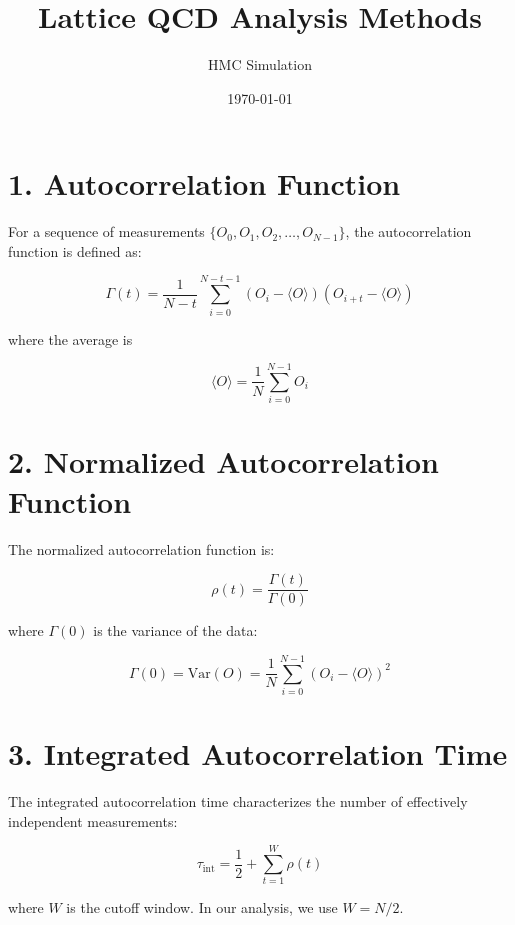 \documentclass[12pt,a4paper]{article}
\title{Lattice QCD Analysis Methods}
\author{HMC Simulation}
\date{\today}
\begin{document}
\maketitle

\section*{1. Autocorrelation Function}

For a sequence of measurements $\{O_0, O_1, O_2, \dots, O_{N-1}\}$, the autocorrelation function is defined as:

\begin{equation}
\Gamma(t) = \frac{1}{N-t} \sum_{i=0}^{N-t-1} (O_i - \langle O \rangle)(O_{i+t} - \langle O \rangle)
\end{equation}

where the average is

\begin{equation}
\langle O \rangle = \frac{1}{N} \sum_{i=0}^{N-1} O_i
\end{equation}

\section*{2. Normalized Autocorrelation Function}

The normalized autocorrelation function is:

\begin{equation}
\rho(t) = \frac{\Gamma(t)}{\Gamma(0)}
\end{equation}

where $\Gamma(0)$ is the variance of the data:

\begin{equation}
\Gamma(0) = \text{Var}(O) = \frac{1}{N} \sum_{i=0}^{N-1} (O_i - \langle O \rangle)^2
\end{equation}

\section*{3. Integrated Autocorrelation Time}

The integrated autocorrelation time characterizes the number of effectively independent measurements:

\begin{equation}
\tau_{\text{int}} = \frac{1}{2} + \sum_{t=1}^{W} \rho(t)
\end{equation}

where $W$ is the cutoff window. In our analysis, we use $W = N/2$.
\end{document}
